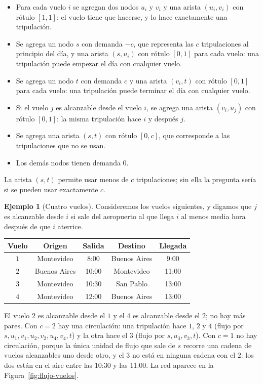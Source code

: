 \documentclass[12pt, spanish, oneside, openany]{book}
\theoremstyle{uprightplain}
\theoremstyle{definition}
\newtheorem{ejemplo}[teorema]{Ejemplo}
\theoremstyle{remark}
\theoremstyle{definition}
\begin{document}
\begin{itemize}
    \item Para cada vuelo $i$ se agregan dos nodos $u_i$ y $v_i$ y una arista $(u_i,v_i)$ con rótulo $[1,1]$: el vuelo tiene que hacerse, y lo hace exactamente una tripulación.
    \item Se agrega un nodo $s$ con demanda $-c$, que representa las $c$ tripulaciones al principio del día, y una arista $(s,u_i)$ con rótulo $[0,1]$ para cada vuelo: una tripulación puede empezar el día con cualquier vuelo.
    \item Se agrega un nodo $t$ con demanda $c$ y una arista $(v_i,t)$ con rótulo $[0,1]$ para cada vuelo: una tripulación puede terminar el día con cualquier vuelo.
    \item Si el vuelo $j$ es alcanzable desde el vuelo $i$, se agrega una arista $(v_i,u_j)$ con rótulo $[0,1]$: la misma tripulación hace $i$ y después $j$.
    \item Se agrega una arista $(s,t)$ con rótulo $[0,c]$, que corresponde a las tripulaciones que no se usan.
    \item Los demás nodos tienen demanda $0$.
\end{itemize}

La arista $(s,t)$ permite usar menos de $c$ tripulaciones; sin ella la pregunta sería si se pueden usar exactamente $c$.

\begin{ejemplo}[Cuatro vuelos]
\label{ej:flujo-vuelos}
Consideremos los vuelos siguientes, y digamos que $j$ es alcanzable desde $i$ si sale del aeropuerto al que llega $i$ al menos media hora después de que $i$ aterrice.
\begin{center}
\small
\renewcommand{\arraystretch}{1.15}
\begin{tabular}{@{}ccccc@{}}
\toprule
\textbf{Vuelo} & \textbf{Origen} & \textbf{Salida} & \textbf{Destino} & \textbf{Llegada}\\
\midrule
$1$ & Montevideo & 8:00 & Buenos Aires & 9:00\\
$2$ & Buenos Aires & 10:00 & Montevideo & 11:00\\
$3$ & Montevideo & 10:30 & San Pablo & 13:00\\
$4$ & Montevideo & 12:00 & Buenos Aires & 13:00\\
\bottomrule
\end{tabular}
\end{center}
El vuelo $2$ es alcanzable desde el $1$ y el $4$ es alcanzable desde el $2$; no hay más pares. Con $c=2$ hay una circulación: una tripulación hace $1$, $2$ y $4$ (flujo por $s,u_1,v_1,u_2,v_2,u_4,v_4,t$) y la otra hace el $3$ (flujo por $s,u_3,v_3,t$). Con $c=1$ no hay circulación, porque la única unidad de flujo que sale de $s$ recorre una cadena de vuelos alcanzables uno desde otro, y el $3$ no está en ninguna cadena con el $2$: los dos están en el aire entre las 10:30 y las 11:00. La red aparece en la Figura~\ref{fig:flujo-vuelos}.
\end{ejemplo}
\end{document}
